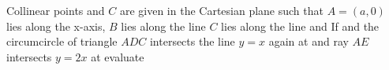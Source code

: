 Collinear points   and $C$ are given in the Cartesian plane such that $A= (a, 0)$ lies along the x-axis, $B$ lies along the line  $C$ lies along the line  and  If  and the circumcircle of triangle $ADC$ intersects the line $y=x$ again at  and ray $AE$ intersects $y=2x$ at  evaluate 